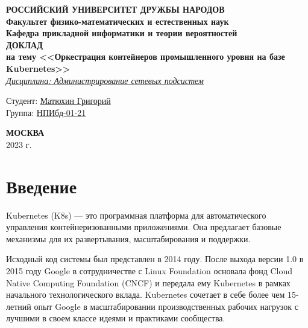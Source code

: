 \documentclass[a4page]{article}
\begin{document}
\begin{titlepage}

	\begin{center}
		\hfill \break
		\textbf{
			\large{РОССИЙСКИЙ УНИВЕРСИТЕТ ДРУЖБЫ НАРОДОВ}\\
			\normalsize{Факультет физико-математических и естественных наук}\\
			\normalsize{Кафедра прикладной информатики и теории вероятностей}\\
		}
		\vspace*{\fill}
		\Large{\textbf{ДОКЛАД\\ на тему <<Оркестрация контейнеров промышленного уровня на базе Kubernetes>>}}
		\\
		\underline{\textit{\normalsize{Дисциплина: Администрирование сетевых подсистем}}}
		\vspace*{\fill}

	\end{center}

	\begin{flushright}
		Студент: \underline{Матюхин Григорий}\\ \vspace{0.5cm}
		Группа: \underline{НПИбд-01-21}
	\end{flushright}


	\begin{center} \textbf{МОСКВА} \\ 2023 г. \end{center}
	\thispagestyle{empty} %

\end{titlepage}

\newpage

\tableofcontents

\newpage
\section{Введение}
Kubernetes (K8s) --- это программная платформа для автоматического управления контейнеризованными приложениями. Она предлагает базовые механизмы для их развертывания, масштабирования и поддержки.

Исходный код системы был представлен в 2014 году. После выхода версии 1.0 в 2015 году Google в сотрудничестве с Linux Foundation основала фонд Cloud Native Computing Foundation (CNCF) и передала ему Kubernetes в рамках начального технологического вклада. Kubernetes сочетает в себе более чем 15-летний опыт Google в масштабировании производственных рабочих нагрузок с лучшими в своем классе идеями и практиками сообщества.
\end{document}
